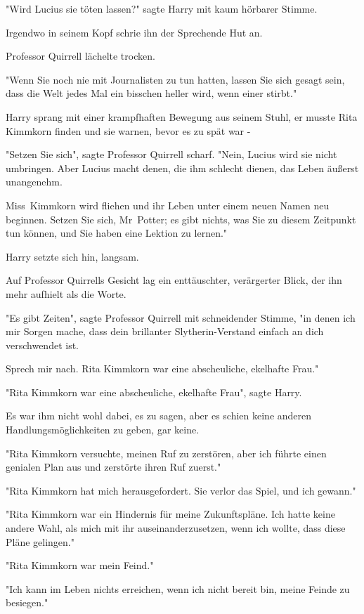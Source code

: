 {"Wird Lucius sie töten lassen?" sagte Harry mit kaum hörbarer Stimme.

Irgendwo in seinem Kopf schrie ihn der Sprechende Hut an.

Professor Quirrell lächelte trocken.

"Wenn Sie noch nie mit Journalisten zu tun hatten, lassen Sie sich gesagt sein, dass die Welt jedes Mal ein bisschen heller wird, wenn einer stirbt."

Harry sprang mit einer krampfhaften Bewegung aus seinem Stuhl, er musste Rita Kimmkorn finden und sie warnen, bevor es zu spät war -

"Setzen Sie sich", sagte Professor Quirrell scharf. "Nein, Lucius wird sie nicht umbringen. Aber Lucius macht denen, die ihm schlecht dienen, das Leben äußerst unangenehm.

Miss~Kimmkorn wird fliehen und ihr Leben unter einem neuen Namen neu beginnen. Setzen Sie sich, Mr~Potter; es gibt nichts, was Sie zu diesem Zeitpunkt tun können, und Sie haben eine Lektion zu lernen."

Harry setzte sich hin, langsam.

Auf Professor Quirrells Gesicht lag ein enttäuschter, verärgerter Blick, der ihn mehr aufhielt als die Worte.

"Es gibt Zeiten", sagte Professor Quirrell mit schneidender Stimme, "in denen ich mir Sorgen mache, dass dein brillanter Slytherin-Verstand einfach an dich verschwendet ist.

Sprech mir nach. Rita Kimmkorn war eine abscheuliche, ekelhafte Frau."

"Rita Kimmkorn war eine abscheuliche, ekelhafte Frau", sagte Harry.

Es war ihm nicht wohl dabei, es zu sagen, aber es schien keine anderen Handlungsmöglichkeiten zu geben, gar keine.

"Rita Kimmkorn versuchte, meinen Ruf zu zerstören, aber ich führte einen genialen Plan aus und zerstörte ihren Ruf zuerst."

"Rita Kimmkorn hat mich herausgefordert. Sie verlor das Spiel, und ich gewann."

"Rita Kimmkorn war ein Hindernis für meine Zukunftspläne. Ich hatte keine andere Wahl, als mich mit ihr auseinanderzusetzen, wenn ich wollte, dass diese Pläne gelingen."

"Rita Kimmkorn war mein Feind."

"Ich kann im Leben nichts erreichen, wenn ich nicht bereit bin, meine Feinde zu besiegen."

}
